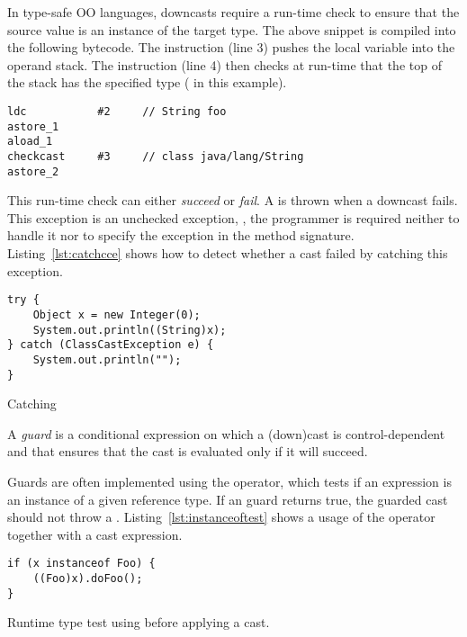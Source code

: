 In type-safe OO languages, downcasts require
a run-time check to ensure that the source value is an instance of the target type.
The above snippet is compiled into the following \java{} bytecode.
The  instruction (line 3) pushes the local variable  into the operand stack.
The  instruction (line 4) then checks at run-time that the top of the stack has the specified type ( in this example).

\begin{lstlisting}[style=bytecode]
ldc           #2     // String foo
astore_1
aload_1
checkcast     #3     // class java/lang/String
astore_2
\end{lstlisting}

This run-time check can either \emph{succeed} or \emph{fail}.
A  is thrown when a downcast fails.
This exception is an unchecked exception, \ie,
the programmer is required neither to handle it
nor to specify the exception in the method signature.
Listing~\ref{lst:catchcce} shows how to detect whether a cast failed by catching this exception.

\begin{listing}[H]
\begin{verbatim}	
try {
	Object x = new Integer(0);
	System.out.println((String)x); 
} catch (ClassCastException e) { 
	System.out.println(""); 
}
\end{verbatim}
\caption{Catching }
\label{lst:catchcce}
\end{listing}

A \emph{guard} is a conditional expression on which a (down)cast is control-dependent and that ensures that the cast is evaluated only if it will succeed.

Guards are often implemented using the  operator, which tests
if an expression is an instance of a given reference type.
If an  guard returns true, the guarded cast should not throw
a .
Listing~\ref{lst:instanceoftest} shows a usage of the  operator together with a cast expression.

\begin{listing}[H]
\begin{verbatim}
if (x instanceof Foo) {
	((Foo)x).doFoo();
}
\end{verbatim}
\caption{Runtime type test using  before applying a cast.}
\label{lst:instanceoftest}
\end{listing}

